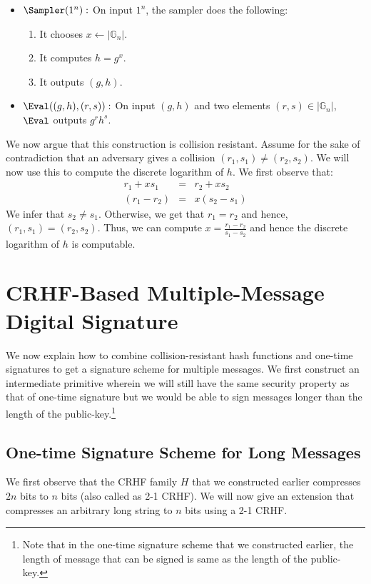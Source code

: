 \begin{itemize}
\item $\Sampler(1^n):$ On input $1^n$, the sampler does the following:
\begin{enumerate}
    \item It chooses $x \gets |\mathbb{G}_n|$.
    \item It computes $h = g^x$.
    \item It outputs $(g,h)$.

\end{enumerate}
\item $\Eval((g,h),(r,s)):$ On input $(g,h)$ and two elements $(r,s) \in |\mathbb{G}_n|$, $\Eval$ outputs $g^rh^s$.
\end{itemize}

We now argue that this construction is collision resistant. Assume for the sake of contradiction that an adversary gives a collision $(r_1,s_1) \neq (r_2,s_2)$. We will now use this to compute the discrete logarithm of $h$. We first observe that:
\begin{eqnarray*}
r_1+xs_1 &=& r_2 + xs_2\\
(r_1 - r_2) &=& x(s_2 - s_1)
\end{eqnarray*}
We infer that $s_2 \neq s_1$. Otherwise, we get that $r_1 = r_2$ and hence, $(r_1,s_1) = (r_2,s_2)$. Thus, we can compute $x = \frac{r_1-r_2}{s_1 - s_2}$ and hence the discrete logarithm of $h$ is computable.


\section{CRHF-Based Multiple-Message Digital Signature}

We now explain how to combine collision-resistant hash functions and one-time signatures to get a signature scheme for multiple messages. We first construct an intermediate primitive wherein we will still have the same security property as that of one-time signature but we would be able to sign messages longer than the length of the public-key.\footnote{Note that in the one-time signature scheme that we constructed earlier, the length of message that can be signed is same as the length of the public-key.}


\subsection{One-time Signature Scheme for Long Messages}
We first observe that the CRHF family $H$ that we constructed earlier compresses $2n$ bits to $n$ bits (also called as 2-1 CRHF). We will now give an extension that compresses an arbitrary long string to $n$ bits using a 2-1 CRHF.
